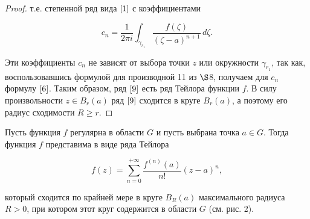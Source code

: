 \begin{proof}
т.е. степенной ряд вида $\eqref{1}$ с коэффициентами

\begin{equation} \label{10}
c_n = \frac{1}{2\pi i} \int_{\gamma_{r_1}} \frac{f(\zeta)}{(\zeta - a)^{n + 1}} \,d\zeta.
\end{equation}

Эти коэффициенты $c_n$ не зависят от выбора точки $z$ или окружности $\gamma_{r_1}$, так как, воспользовавшись формулой для производной 11 из $\S$8, получаем для $c_n$ формулу $\eqref{6}$. Таким образом, ряд $\eqref{9}$ есть ряд Тейлора функции $f$. В силу произвольности $z \in B_r(a)$ ряд $\eqref{9}$ сходится в круге $B_r(a)$, а поэтому его радиус сходимости $R \ge r$.
\end{proof}

\begin{cons} \label{cons1}
Пусть функция $f$ регулярна в области $G$ и пусть выбрана точка $a \in G$. Тогда функция $f$ представима в виде ряда Тейлора

$$
f(z) = \sum\limits_{n = 0}^{+\infty} \frac{f^{(n)}(a)}{n!} (z - a)^n,
$$

который сходится по крайней мере в круге $B_R(a)$ максимального радиуса $R > 0$, при котором этот круг содержится в области $G$ (см. рис. 2).

\end{cons}